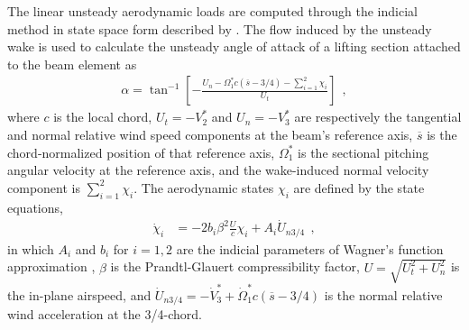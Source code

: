 \documentclass[journal]{new-aiaa}
\def\lb{\left[}
\def\rb{\right]}
\def\lp{\left(}
\def\rp{\right)}
\begin{document}
The linear unsteady aerodynamic loads are computed through the indicial method in state space form described by \cite{leishman2006principles}. The flow induced by the unsteady wake is used to calculate the unsteady angle of attack of a lifting section attached to the beam element as
\begin{align}
    \alpha = \tan^{-1}\lb-\frac{U_n-\Omega^{*}_1 c\lp \overline{s}-3/4 \rp-\sum_{i=1}^{2}\chi_i}{U_t}\rb \ \ ,
    \label{eq:alpha}
\end{align}
where $c$ is the local chord, $U_t = -V^{*}_2$ and $U_n = -V^{*}_3$ are respectively the tangential and normal relative wind speed components at the beam's reference axis, $\overline{s}$ is the chord-normalized position of that reference axis, $\Omega^{*}_1$ is the sectional pitching angular velocity at the reference axis, and the wake-induced normal velocity component is $\sum_{i=1}^{2}\chi_i$. The aerodynamic states $\chi_i$ are defined by the state equations,
\begin{align}
    \dot{\chi}_i &= -2b_i\beta^2\frac{U}{c}\chi_i + A_i \dot{U}_{n3/4} \ \ ,
    \label{eq:chi_state_eqs}
\end{align}
in which $A_i$ and $b_i$ for $i=1,2$ are the indicial parameters of Wagner's function approximation \cite{leishman2006principles}, $\beta$ is the Prandtl-Glauert compressibility factor, $U=\sqrt{U_t^2+U_n^2}$ is the in-plane airspeed, and $ \dot{U}_{n3/4} = -\dot{V}^{*}_3+\dot{\Omega}^{*}_1 c\lp \overline{s}-3/4 \rp $ is the normal relative wind acceleration at the 3/4-chord.
\end{document}
